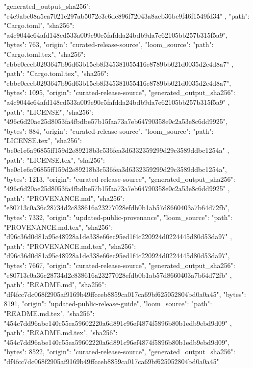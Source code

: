{{      "generated_output_sha256": "c4e9abc08a5ca7021e297ab5072c3e6de896f72043a8aeb36be9f46f1549fd34"
    },
    {
      "path": "Cargo.toml",
      "sha256": "a4c9044e64afd148cd533a009e90e5fafdda24bdb9da7e62105bb257b315f5a9",
      "bytes": 763,
      "origin": "curated-release-source",
      "loom_source": {
        "path": "Cargo.toml.tex",
        "sha256": "cbbc0eeeb0293647b96d63b15cb8f345381055416e8789bb021d0035d2e4d8a7"
      }
    },
    {
      "path": "Cargo.toml.tex",
      "sha256": "cbbc0eeeb0293647b96d63b15cb8f345381055416e8789bb021d0035d2e4d8a7",
      "bytes": 1095,
      "origin": "curated-release-source",
      "generated_output_sha256": "a4c9044e64afd148cd533a009e90e5fafdda24bdb9da7e62105bb257b315f5a9"
    },
    {
      "path": "LICENSE",
      "sha256": "496c6d20ae25d8053fa4fbdbe57b15faa73a7eb64790358e0c2a53e8c6dd9925",
      "bytes": 884,
      "origin": "curated-release-source",
      "loom_source": {
        "path": "LICENSE.tex",
        "sha256": "be0c1e6a96855ff159d2e89218b3c536fea3d6332359299d29c3589ddbc1254a"
      }
    },
    {
      "path": "LICENSE.tex",
      "sha256": "be0c1e6a96855ff159d2e89218b3c536fea3d6332359299d29c3589ddbc1254a",
      "bytes": 1213,
      "origin": "curated-release-source",
      "generated_output_sha256": "496c6d20ae25d8053fa4fbdbe57b15faa73a7eb64790358e0c2a53e8c6dd9925"
    },
    {
      "path": "PROVENANCE.md",
      "sha256": "e80713c0a36c28734d2c838616a23277028efdb0b1ab57d8660403a7b64d72fb",
      "bytes": 7332,
      "origin": "updated-public-provenance",
      "loom_source": {
        "path": "PROVENANCE.md.tex",
        "sha256": "d96c36d0d81a95c48928a1de338e66ec95ed1f4c220924d0224445d80d53da97"
      }
    },
    {
      "path": "PROVENANCE.md.tex",
      "sha256": "d96c36d0d81a95c48928a1de338e66ec95ed1f4c220924d0224445d80d53da97",
      "bytes": 7667,
      "origin": "curated-release-source",
      "generated_output_sha256": "e80713c0a36c28734d2c838616a23277028efdb0b1ab57d8660403a7b64d72fb"
    },
    {
      "path": "README.md",
      "sha256": "df4fcc7dc068f2905af9169b49ffcceb8859ca017ca69bf625052804bd0a0a45",
      "bytes": 8191,
      "origin": "updated-public-release-guide",
      "loom_source": {
        "path": "README.md.tex",
        "sha256": "454c7dd96abe140c55ea59602220a6d891c96ef4874f5896b80b1edb9ebd9d09"
      }
    },
    {
      "path": "README.md.tex",
      "sha256": "454c7dd96abe140c55ea59602220a6d891c96ef4874f5896b80b1edb9ebd9d09",
      "bytes": 8522,
      "origin": "curated-release-source",
      "generated_output_sha256": "df4fcc7dc068f2905af9169b49ffcceb8859ca017ca69bf625052804bd0a0a45"
}}
